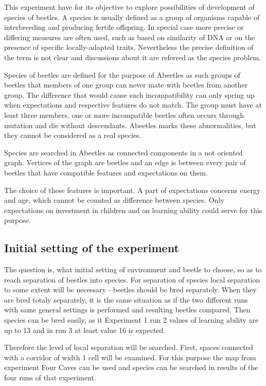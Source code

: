 \documentclass[a4paper,12pt]{report}
\begin{document}
This experiment have for its objective to explore possibilities of development of species of beetles. A species is usually defined as a group of organisms capable of interbreeding and producing fertile offspring. In special case more precise or differing measures are often used, such as based on similarity of DNA or on the presence of specific locally-adapted traits. Nevertheless the precise definition of the term is not clear and discussions about it are referred as the species problem.\cite{Species} 

Species of beetles are defined for the purpose of Abeetles as such groups of beetles that members of one group can never mate with beetles from another group. The difference that would cause such incompatibility can only spring up when expectations and respective features do not match. The group must have at least three members, one or more incompatible beetles often occurs through mutation and die without descendants. Abeetles marks these abnormalities, but they cannot be considered as a real species. 

Species are searched in Abeetles as connected components in a not oriented graph. Vertices of the graph are beetles and an edge is between every pair of beetles that have compatible features and expectations on them.
 
The choice of these features is important. A part of expectations concerns energy and age, which cannot be counted as difference between species. Only expectations on investment in children and on learning ability could serve for this purpose. 

\subsection{Initial setting of the experiment}
The question is, what initial setting of environment and beetle to choose, so as to reach separation of beetles into species. For separation of species local separation to some extent will be necessary - beetles should be bred separately. When they are bred totaly separately, it is the same situation as if the two different runs with same general settings is performed and resulting beetles compared. Then species can be bred easily, as it Experiment 1 run 2 values of learning ability are up to 13 and in run 3 at least value 16 is expected. 

Therefore the level of local separation will be searched. First, spaces connected with a corridor of width 1 cell will be examined. For this purpose the map from experiment Four Caves can be used and species can be searched in results of the four runs of that experiment.  
\end{document}
